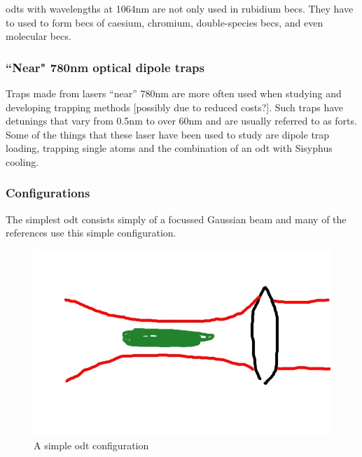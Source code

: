\glspl{odt} with wavelengths at 1064nm are not only used in rubidium \glspl{bec}. They have to used to form \glspl{bec} of caesium\cite{hung_accelerating_2008}, chromium\cite{beaufils_all-optical_2008}, double-species \glspl{bec}\cite{thalhammer_double_2008}, and even molecular \glspl{bec}\cite{zwierlein_observation_2003}.

\subsubsection{``Near" 780nm optical dipole traps}
Traps made from lasers ``near'' 780nm are more often used when studying and developing trapping methods [possibly due to reduced costs?]. Such traps have detunings that vary from 0.5nm\cite{miller_rf-induced_2002} to over 60nm\cite{miller_far-off-resonance_1993, weber_analysis_2006} and are usually referred to as \glspl{fort}. Some of the things that these laser have been used to study are dipole trap loading\cite{kuppens_loading_2000}, trapping single atoms\cite{weber_analysis_2006} and the combination of an \gls{odt} with Sisyphus cooling\cite{miller_rf-induced_2002}.

\subsubsection{Configurations}
The simplest \gls{odt} consists simply of a focussed Gaussian beam\cite{chu_experimental_1986} and many of the references use this simple configuration.

\begin{figure}[h]
	\centering
	\includegraphics[scale=0.32]{figs/simpledipoletrap.jpg}
	\caption[Title]{A simple \gls{odt} configuration}
	\label{figs/MOT.pdf}
\end{figure}

